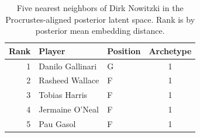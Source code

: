 \begin{table}[htbp]
  \centering\small
  \begin{tabular}{rllc}
    \toprule
    Rank & Player & Position & Archetype \\
    \midrule
    1 & Danilo Gallinari & G & 1 \\
    2 & Rasheed Wallace & F & 1 \\
    3 & Tobias Harris & F & 1 \\
    4 & Jermaine O'Neal & F & 1 \\
    5 & Pau Gasol & F & 1 \\
    \bottomrule
  \end{tabular}
  \caption{Five nearest neighbors of Dirk Nowitzki in the Procrustes-aligned posterior latent space. Rank is by posterior mean embedding distance.}
  \label{tab:Dirk_Nowitzki_neighbors}
\end{table}

